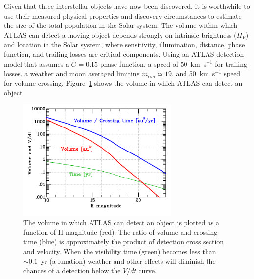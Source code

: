\documentclass[twocolumn,longbib]{aastex7}
\begin{document}
\begin{CJK*}{UTF8}{gbsn}

Given that three interstellar objects have now been discovered, it is worthwhile to use their measured physical properties and discovery circumstances to estimate the size of the total population in the Solar system.
The volume within which ATLAS can detect a moving object depends strongly on intrinsic brightness ($H_V$) and location in the Solar system, where sensitivity, illumination, distance, phase function, and trailing losses are critical components.  Using an ATLAS detection model that assumes a $G=0.15$ phase function, a speed of 50~km~s$^{-1}$ for trailing losses, a weather and moon averaged limiting $m_{lim}\simeq19$, and 50~km~s$^{-1}$ speed for volume crossing, Figure~\ref{fig:3I_rate} shows the volume in which ATLAS can detect an object.

\begin{figure}
\includegraphics[width=80mm]{static/3I_xc.png}
\caption{The volume in which ATLAS can detect an object is plotted as a function of H magnitude (red).  The ratio of volume and crossing time (blue) is approximately the product of detection cross section and velocity.  When the visibility time (green) becomes less than $\sim0.1$~yr (a lunation) weather and other effects will diminish the chances of a detection below the $V/dt$ curve.}
\label{fig:3I_rate}
\end{figure}


\end{CJK*}
\end{document}
